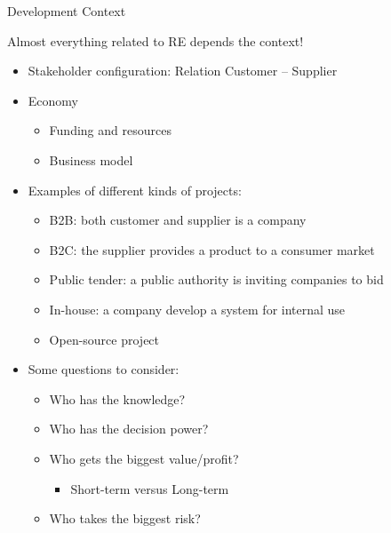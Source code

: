 
\begin{Slide}{Development Context}

Almost everything related to RE depends the context!

\begin{itemize}
\item Stakeholder configuration: Relation Customer -- Supplier

\item Economy 
\begin{itemize}
\item Funding and resources
\item Business model

\end{itemize}
\item Examples of different kinds of projects:
\begin{itemize}
\item B2B: both customer and supplier is a company
\item B2C: the supplier provides a product to a consumer market
\item Public tender: a public authority is inviting companies to bid
\item In-house: a company develop a system for internal use
\item Open-source project

\end{itemize}
\item Some questions to consider:
\begin{itemize}
\item Who has the knowledge?
\item Who has the decision power?
\item Who gets the biggest value/profit?
\begin{itemize}
\item Short-term versus Long-term
\end{itemize}
\item Who takes the biggest risk?

\end{itemize}
\end{itemize}
\end{Slide}